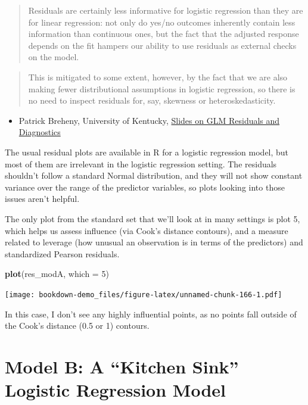 \documentclass[]{book}
\newenvironment{Shaded}{\begin{snugshade}}{\end{snugshade}}
\newcommand{\KeywordTok}[1]{\textcolor[rgb]{0.13,0.29,0.53}{\textbf{#1}}}
\newcommand{\DataTypeTok}[1]{\textcolor[rgb]{0.13,0.29,0.53}{#1}}
\newcommand{\DecValTok}[1]{\textcolor[rgb]{0.00,0.00,0.81}{#1}}
\newcommand{\NormalTok}[1]{#1}
\providecommand{\tightlist}{%
  \setlength{\itemsep}{0pt}\setlength{\parskip}{0pt}}
\theoremstyle{definition}
\theoremstyle{definition}
\theoremstyle{definition}
\theoremstyle{remark}
\begin{document}
\begin{quote}
Residuals are certainly less informative for logistic regression than
they are for linear regression: not only do yes/no outcomes inherently
contain less information than continuous ones, but the fact that the
adjusted response depends on the fit hampers our ability to use
residuals as external checks on the model.
\end{quote}

\begin{quote}
This is mitigated to some extent, however, by the fact that we are also
making fewer distributional assumptions in logistic regression, so there
is no need to inspect residuals for, say, skewness or
heteroskedasticity.
\end{quote}

\begin{itemize}
\tightlist
\item
  Patrick Breheny, University of Kentucky,
  \href{https://web.as.uky.edu/statistics/users/pbreheny/760/S13/notes/3-26.pdf}{Slides
  on GLM Residuals and Diagnostics}
\end{itemize}

The usual residual plots are available in R for a logistic regression
model, but most of them are irrelevant in the logistic regression
setting. The residuals shouldn't follow a standard Normal distribution,
and they will not show constant variance over the range of the predictor
variables, so plots looking into those issues aren't helpful.

The only plot from the standard set that we'll look at in many settings
is plot 5, which helps us assess influence (via Cook's distance
contours), and a measure related to leverage (how unusual an observation
is in terms of the predictors) and standardized Pearson residuals.

\begin{Shaded}
\begin{Highlighting}[]
\KeywordTok{plot}\NormalTok{(res_modA, }\DataTypeTok{which =} \DecValTok{5}\NormalTok{)}
\end{Highlighting}
\end{Shaded}

\texttt{[image: bookdown-demo\_files/figure-latex/unnamed-chunk-166-1.pdf]}

In this case, I don't see any highly influential points, as no points
fall outside of the Cook's distance (0.5 or 1) contours.

\section{\texorpdfstring{Model B: A ``Kitchen Sink'' Logistic Regression
Model}{Model B: A Kitchen Sink Logistic Regression Model}}\label{model-b-a-kitchen-sink-logistic-regression-model}
\end{document}
